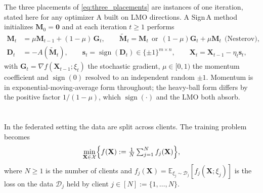 The three placements of \eqref{eq:three_placements} are instances of one iteration, stated here for any optimizer A built on LMO directions. A Sign\,A method initializes $\mathbf{M}_0 = \mathbf{0}$ and at each iteration $t \ge 1$ performs
\begin{equation}
\label{eq:signa_general}
\begin{aligned}
\mathbf{M}_t &= \mu \mathbf{M}_{t-1} + (1-\mu)\,\mathbf{G}_t,
\qquad
\tilde{\mathbf{M}}_t = \mathbf{M}_t
   \ \ \text{or}\ \ (1-\mu)\mathbf{G}_t + \mu \mathbf{M}_t\ \ \text{(Nesterov)},\\
\mathbf{D}_t &= -A(\tilde{\mathbf{M}}_t),
   \qquad \mathbf{s}_t = \operatorname{sign}(\mathbf{D}_t) \in \{\pm 1\}^{m \times n},
   \qquad \mathbf{X}_{t} = \mathbf{X}_{t-1} - \eta_t \mathbf{s}_t,
\end{aligned}
\end{equation}
with $\mathbf{G}_t = \nabla f(\mathbf{X}_{t-1};\xi_t)$ the stochastic gradient, $\mu \in [0, 1)$ the momentum coefficient and $\operatorname{sign}(0)$ resolved to an independent random $\pm1$. Momentum is in exponential-moving-average form throughout; the heavy-ball form differs by the positive factor $1/(1-\mu)$, which $\operatorname{sign}(\cdot)$ and the LMO both absorb.

\section{}\label{app:opt:fed}

In the federated setting the data are split across clients. The training problem becomes
\begin{equation}
\min_{\mathbf{X} \in \mathcal{X}} \Bigl\{ f(\mathbf{X}) := \tfrac{1}{N}\textstyle\sum_{j=1}^N f_j(\mathbf{X})\Bigr\},
\label{eq:opt:fed}
\end{equation}
where $N \ge 1$ is the number of clients and $f_j(\mathbf{X})=\mathbb{E}_{\xi_j\sim\mathcal{D}_j}[f_j(\mathbf{X};\xi_j)]$ is the loss on the data $\mathcal{D}_j$ held by client $j \in [N] := \{1, \dots, N\}$.

